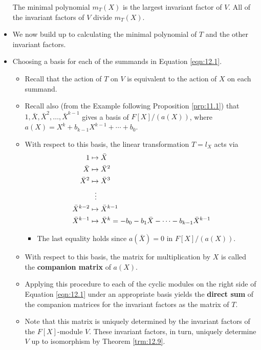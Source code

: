 \documentclass[../notes.tex]{subfiles}
\begin{document}
\begin{itemize}
    \begin{proposition}\label{prp:12.13}
        The minimal polynomial $m_T(X)$ is the largest invariant factor of $V$. All of the invariant factors of $V$ divide $m_T(X)$.
    \end{proposition}
    \item We now build up to calculating the minimal polynomial of $T$ and the other invariant factors.
    \item Choosing a basis for each of the summands in Equation \ref{eqn:12.1}.
    \begin{itemize}
        \item Recall that the action of $T$ on $V$ is equivalent to the action of $X$ on each summand.
        \item Recall also (from the Example following Proposition \ref{prp:11.1}) that $1,\bar{X},\bar{X}^2,\dots,\bar{X}^{k-1}$ gives a basis of $F[X]/(a(X))$, where $a(X)=X^k+b_{k-1}X^{k-1}+\cdots+b_0$.
        \item With respect to this basis, the linear transformation $T=l_X$ acts via
        \begin{align*}
            1 &\mapsto \bar{X}\\
            \bar{X} &\mapsto \bar{X}^2\\
            \bar{X}^2 &\mapsto \bar{X}^3\\
            &\hspace{2.5mm}\vdots\\
            \bar{X}^{k-2} &\mapsto \bar{X}^{k-1}\\
            \bar{X}^{k-1} &\mapsto \bar{X}^k = -b_0-b_1\bar{X}-\cdots-b_{k-1}\bar{X}^{k-1}
        \end{align*}
        \begin{itemize}
            \item The last equality holds since $a(\bar{X})=0$ in $F[X]/(a(X))$.
        \end{itemize}
        \item With respect to this basis, the matrix for multiplication by $X$ is called the \textbf{companion matrix} of $a(X)$.
        \item Applying this procedure to each of the cyclic modules on the right side of Equation \ref{eqn:12.1} under an appropriate basis yields the \textbf{direct sum} of the companion matrices for the invariant factors as the matrix of $T$.
        \item Note that this matrix is uniquely determined by the invariant factors of the $F[X]$-module $V$. These invariant factors, in turn, uniquely determine $V$ up to isomorphism by Theorem \ref{trm:12.9}.

\end{itemize}
\end{itemize}
\end{document}
